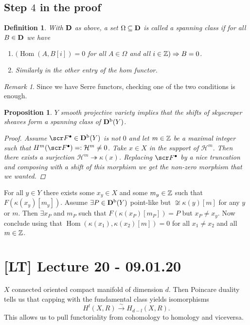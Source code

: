 \documentclass[A4paper, british, reqno]{amsart}
\theoremstyle{darkgreentheorem}
\newtheorem{prop}[thm]{Proposition}
\theoremstyle{darkbluedefinition}
\newtheorem{defn}[thm]{Definition}
\theoremstyle{darkredexample}
\theoremstyle{remark}
\newtheorem{rem}[thm]{Remark}
\DeclareMathOperator{\Hom}{Hom}
\renewcommand{\H}{\mathcal{H}}
\newcommand{\1}{\mathbbm{1}}
\newcommand{\grd}{^{\bullet}}
\newcommand{\sub}{\subseteq}
\newcommand{\epi}{\twoheadrightarrow}
\begin{document}
\subsection{Step $4$ in the proof}

\begin{defn}
    With $\mathbf{D}$ as above, a set $\Omega\sub \D$ is called a \textit{spanning class} if for all $B\in \mathbf{D}$ we have
    \begin{enumerate}
	\item $(\Hom(A,B[i])=0 $ for all $A\in \Omega$ and all $i\in \mathbb{Z} ) \Rightarrow B=0$.
	\item Similarly in the other entry of the hom functor.
    \end{enumerate}
\end{defn}

\begin{rem}
    Since we have Serre functors, checking one of the two conditions is enough.
\end{rem}

\begin{prop}
    $Y$ smooth projective variety implies that the shifts of skyscraper sheaves form a spanning class of $\mathbf{D}^{\mathrm{b}}(Y)$.
    \begin{proof}
	Assume $\F\grd\in \Db(Y)$ is not $0$ and let $m\in \mathbb{Z}$ be a maximal integer such that $H^{m}(\F\grd)=:\H^{m}\neq 0$.
	Take $x\in X$ in the support of $\H^{m}$.
	Then there exists a surjection $\H^{m}\epi \kappa(x)$.
	Replacing $\F\grd$ by a nice truncation and composing with a shift of this morphism we get the non-zero morphism that we wanted.
    \end{proof}
\end{prop}

For all $y\in Y$ there exists some $x_{y}\in X$ and some $m_{y}\in \mathbb{Z}$ such that $F(\kappa(x_{y})[m_{y}])$.
Assume $\exists P\in \mathbf{D}^{\mathrm{b}}(Y)$ point-like but $\not\cong\kappa(y)[m]$ for any $y$ or $m$.
Then $\exists x_{P}$ and $m_{P}$ such that $F(\kappa(x_{P})[m_{P}])=P$ but $x_{P}\neq x_{y}$.
Now conclude using that $\Hom(\kappa(x_{1}),\kappa(x_{2})[m])=0$ for all $x_{1}\neq x_{2}$ and all $m\in \mathbb{Z}$.

\section{[LT] Lecture 20 - 09.01.20}

$X$ connected oriented compact manifold of dimension $d$.
Then Poincare duality tells us that capping with the fundamental class yields isomorphisms
\[ H^{l}(X,R)\xrightarrow{\sim}H_{d-l}(X,R). \]
This allows us to pull functoriality from cohomology to homology and viceversa.
\end{document}

